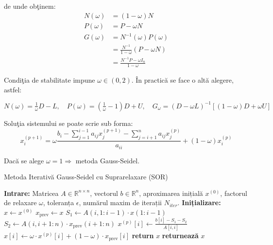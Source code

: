 \documentclass{exam}
\theoremstyle{definition}
\begin{document}
de unde ob\c{t}inem:
\begin{align*}
N(\omega) &= (1 - \omega)N \\
P(\omega) &= P - \omega N \\
G(\omega) &= {N}^{-1}(\omega)P(\omega)\\ &= \frac{{N}^{-1}}{1-\omega}(P - \omega N)\\ &= \frac{{N}^{-1}P - \omega{I}_{n}}{1-\omega} 
\end{align*}



Condi\c{t}ia de stabilitate impune $\omega \in (0,2)$. \^{I}n practic\u{a} se face o alt\u{a} alegere, astfel:

$N(\omega) = \frac{1}{\omega}D - L, \quad P(\omega) = (\frac{1}{\omega} - 1)D + U, \quad {G}_{\omega} = (D-\omega L)^{-1}[(1-\omega)D+\omega U]$

Solu\c{t}ia sistemului se poate scrie sub forma:
$$x_{i}^{(p+1)}=\omega\frac{{b}_{i} - \sum_{j = 1}^{i-1}{a}_{ij}{x}_{j}^{(p+1)} - \sum_{j = i + 1}^{n}{a}_{ij}{x}_{j}^{(p)}}{{a}_{ii}}+(1-\omega)x_{i}^{(p)}$$

Dac\u{a} se alege $\omega = 1 \Rightarrow$ metoda Gauss-Seidel.

\begin{algorithm}[H]
\caption{Metoda Iterativă Gauss-Seidel cu Suprarelaxare (SOR)}
\label{alg:sor}
\begin{algorithmic}[1]
    \State \textbf{Intrare:} Matricea \( A \in \mathbb{R}^{n \times n} \), vectorul \( b \in \mathbb{R}^{n} \), aproximarea inițială \( x^{(0)} \), factorul de relaxare \( \omega \), toleranța \( \epsilon \), numărul maxim de iterații \( N_{iter} \).
    \State \textbf{Inițializare:} \( x \leftarrow x^{(0)} \)
        \State \( x_{\text{prev}} \gets x \) 
            \State \( S_1 \gets A(i,1:i-1) \cdot x(1:i-1) \) 
            \State \( S_2 \gets A(i,i+1:n) \cdot x_{\text{prev}}(i+1:n) \) 
            \State \( x^{(p)}[i] \gets \frac{b[i] - S_1 - S_2}{A[i,i]} \) 
            \State \( x[i] \gets \omega \cdot x^{(p)}[i] + (1 - \omega) \cdot x_{\text{prev}}[i] \) 
        \EndFor
            \State \textbf{return} \( x \)
        \EndIf
    \EndFor
    \State \textbf{returnează} \( x \)
\end{algorithmic}
\end{algorithm}
\end{document}

